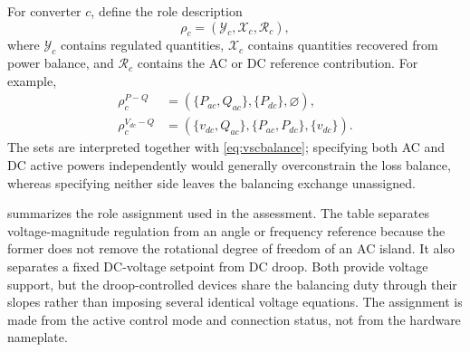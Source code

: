 \documentclass[final,5p,times,twocolumn]{elsarticle}
\begin{document}
For converter $c$, define the role description
\begin{equation}
 \rho_c=(\mathcal Y_c,\mathcal X_c,\mathcal R_c),
 \label{eq:role-tuple}
\end{equation}
where $\mathcal Y_c$ contains regulated quantities, $\mathcal X_c$ contains
quantities recovered from power balance, and $\mathcal R_c$ contains the AC or
DC reference contribution. For example,
\begin{align}
 \rho_c^{P-Q}&=(\{P_{ac},Q_{ac}\},\{P_{dc}\},\varnothing),\\
 \rho_c^{V_{dc}-Q}&=(\{v_{dc},Q_{ac}\},\{P_{ac},P_{dc}\},\{v_{dc}\}).
 \label{eq:role-examples}
\end{align}
The sets are interpreted together with \eqref{eq:vscbalance}; specifying both
AC and DC active powers independently would generally overconstrain the loss
balance, whereas specifying neither side leaves the balancing exchange
unassigned.

 summarizes the role assignment used in the
assessment. The table separates voltage-magnitude regulation from an angle or
frequency reference because the former does not remove the rotational degree
of freedom of an AC island. It also separates a fixed DC-voltage setpoint from
DC droop. Both provide voltage support, but the droop-controlled devices share
the balancing duty through their slopes rather than imposing several identical
voltage equations. The assignment is made from the active control mode and
connection status, not from the hardware nameplate.
\end{document}
